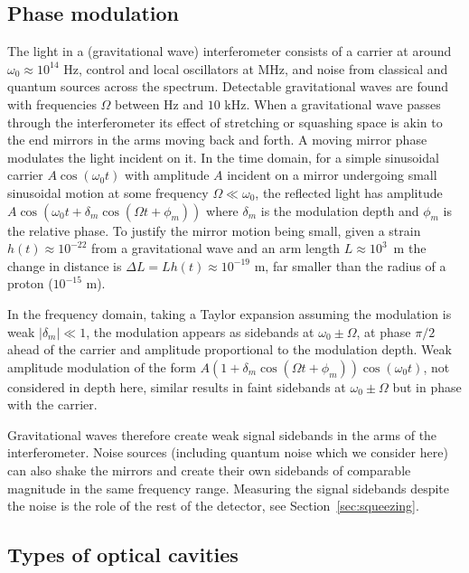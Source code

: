 \documentclass[aps,pra,superscriptaddress,reprint,nofootinbib]{revtex4-1}
\newcommand{\abs}[1]{\left\lvert #1 \right\rvert}
\begin{document}
\subsection{Phase modulation}

The light in a (gravitational wave) interferometer consists of a carrier at around $\omega_0 \approx 10^{14}$ Hz, control and local oscillators at MHz, and noise from classical and quantum sources across the spectrum. Detectable gravitational waves are found with frequencies $\Omega$ between Hz and $10$ kHz. When a gravitational wave passes through the interferometer its effect of stretching or squashing space is akin to the end mirrors in the arms moving back and forth. A moving mirror phase modulates the light incident on it. In the time domain, for a simple sinusoidal carrier $A \cos(\omega_0 t)$ with amplitude $A$ incident on a mirror undergoing small sinusoidal motion at some frequency $\Omega \ll \omega_0$, the reflected light has amplitude $A \cos(\omega_0 t + \delta_m \cos(\Omega t + \phi_m))$ where $\delta_m$ is the modulation depth and $\phi_m$ is the relative phase. To justify the mirror motion being small, given a strain $h(t) \approx 10^{-22}$ from a gravitational wave and an arm length $L \approx 10^3$~m the change in distance is $\Delta L = L h(t) \approx 10^{-19}$ m, far smaller than the radius of a proton ($10^{-15}$ m).


In the frequency domain, taking a Taylor expansion assuming the modulation is weak $\abs{\delta_m} \ll 1$, the modulation appears as sidebands at $\omega_0 \pm \Omega$, at phase $\pi/2$ ahead of the carrier and amplitude proportional to the modulation depth.
Weak amplitude modulation of the form $A (1 + \delta_m \cos(\Omega t + \phi_m)) \cos(\omega_0 t)$, not considered in depth here, similar results in faint sidebands at $\omega_0 \pm \Omega$ but in phase with the carrier.


Gravitational waves therefore create weak signal sidebands in the arms of the interferometer. Noise sources (including quantum noise which we consider here) can also shake the mirrors and create their own sidebands of comparable magnitude in the same frequency range. Measuring the signal sidebands despite the noise is the role of the rest of the detector, see Section~\ref{sec:squeezing}.


\subsection{Types of optical cavities}
\end{document}
